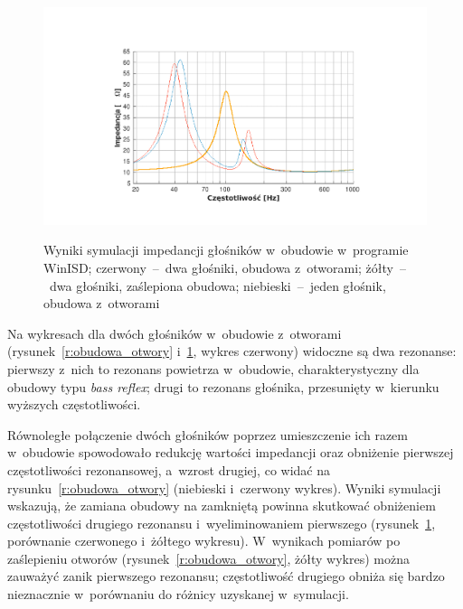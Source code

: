 \documentclass[12pt]{oska}
\begin{document}
	\begin{figure}[!ht]
		\centering
		\includegraphics[width=.8\textwidth,trim={5.1cm 1.5cm 4.7cm 3cm},clip]{winisd_osie.pdf}\\
		\setlength{\unitlength}{1mm}
		\caption{Wyniki symulacji impedancji głośników w~obudowie w~programie WinISD; \color{BrickRed}czerwony\color{Black}~--~dwa głośniki, obudowa z~otworami; \color{Dandelion}żółty\color{Black}~--~dwa głośniki, zaślepiona obudowa; \color{RoyalBlue}niebieski\color{Black}~--~jeden głośnik, obudowa z~otworami}
		\label{r:winisd}
	\end{figure}
	
	Na wykresach dla dwóch głośników w~obudowie z~otworami (rysunek~\ref{r:obudowa_otwory} i~\ref{r:winisd}, wykres czerwony) widoczne są dwa rezonanse: pierwszy z~nich to rezonans powietrza w~obudowie, charakterystyczny dla obudowy typu \textit{bass reflex}; drugi to rezonans głośnika, przesunięty w~kierunku wyższych częstotliwości.
	
	Równoległe połączenie dwóch głośników poprzez umieszczenie ich razem w~obudowie spowodowało redukcję wartości impedancji oraz obniżenie pierwszej częstotliwości rezonansowej, a~wzrost drugiej, co widać na rysunku~\ref{r:obudowa_otwory} (niebieski i~czerwony wykres). Wyniki symulacji wskazują, że zamiana obudowy na zamkniętą powinna skutkować obniżeniem częstotliwości drugiego rezonansu i~wyeliminowaniem pierwszego (rysunek~\ref{r:winisd}, porównanie czerwonego i~żółtego wykresu). W~wynikach pomiarów po zaślepieniu otworów (rysunek~\ref{r:obudowa_otwory}, żółty wykres) można zauważyć zanik pierwszego rezonansu; częstotliwość drugiego obniża się bardzo nieznacznie w~porównaniu do różnicy uzyskanej w~symulacji.
	
\end{document}
